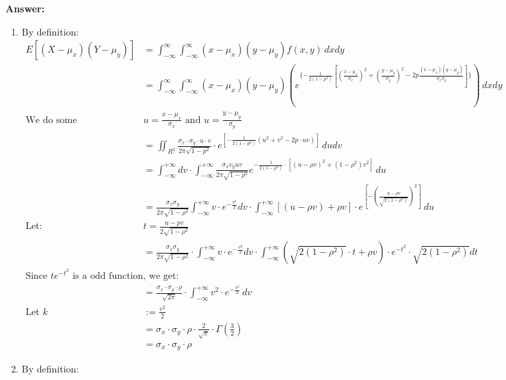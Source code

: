 \documentclass[hidelinks]{article}
\begin{document}
\textbf{Answer:}
\begin{enumerate}
    \item By definition:
    \begin{align*}
        E[(X-\mu_x)(Y - \mu_y)] &= \int^{\infty}_{-\infty}\int^{\infty}_{-\infty} (x-\mu_x)(y - \mu_y)f(x,y) \, dxdy \\
                &= \int^{\infty}_{-\infty}\int^{\infty}_{-\infty} (x-\mu_x)(y - \mu_y)(e^{\{-\frac{1}{2(1-p^{2})}[(\frac{x-\mu_{x}}{\sigma_{x}})^{2}+(\frac{y-\mu_{y}}{\sigma_{y}})^{2}-2p\frac{(x-\mu_{x})(y-\mu_{y})}{\sigma_{x}\sigma_{y}}]\}}) \, dxdy \\
                \text{We do some substitutions:  } &u = \frac{x - \mu_x}{\sigma_x} \text{ and } u = \frac{y - \mu_y}{\sigma_y} \\
                &= \iint_{R^2}\frac{\sigma_x\cdot\sigma_y\cdot u\cdot v}{2\pi\sqrt{1-p^2}}\cdot e^{[-\frac1{2(1-p^2)}(u^2+v^2-2p\cdot uv)]} \, dudv \\
                &= \int_{-\infty}^{+\infty}dv\cdot\int_{-\infty}^{+\infty}\frac{\sigma_{x}v_{y}uv}{2\pi\sqrt{1-\rho^{2}}} e^{-\frac{1}{2(1-\rho^{2})}\cdot[(u-\rho v)^{2}+(1-\rho^{2})v^{2}]} \, du \\
                &= \frac{\sigma_{x}\sigma_{y}}{2\pi\sqrt{1-\rho^{2}}}\int_{-\infty}^{+\infty}v\cdot e^{-\frac{v^{2}}{3}}dv\cdot\int_{-\infty}^{+\infty}[(u-\rho v)+\rho v]\cdot e^{[-(\frac{u-\rho v}{\sqrt{2(1-\rho^{2})}})^{2}]} \,du \\
                \text{Let: } &t = \frac{u - pv}{2\sqrt{1 - \rho^2}} \\
                &= \frac{\sigma_{x}\sigma_{y}}{2\pi\sqrt{1-\rho^{2}}}\cdot\int_{-\infty}^{+\infty}v\cdot e^{-\frac{v^{2}}{2}}dv\cdot\int_{-\infty}^{+\infty}(\sqrt{2(1-\rho^{2})}\cdot t+\rho v)\cdot e^{-t^{2}}\cdot\sqrt{2(1-\rho^{2})}dt\\
                \text{Since } te^{-t^2} \text{ is a odd function, we get: } \\
                &= \frac{\sigma_x\cdot\sigma_y\cdot\rho}{\sqrt{2\pi}}\cdot\int_{-\infty}^{+\infty}v^2\cdot e^{-\frac{v^2}2} \, dv \\
                \text{Let } k &:= \frac{v^2}{2} \\
                &= \sigma_x\cdot\sigma_y\cdot \rho \cdot\frac2{\sqrt{\pi}}\cdot \varGamma(\frac32) \\
                &= \sigma_x\cdot\sigma_y\cdot \rho 
    \end{align*}
    \item By definition:

\end{enumerate}
\end{document}
